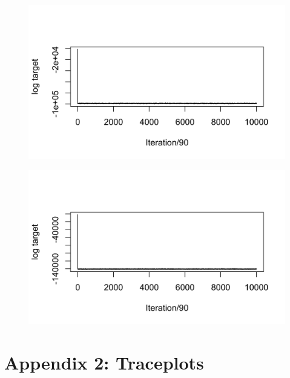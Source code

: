     \begin{figure}[H]
        \begin{center}
            \includegraphics{Log Target Plot - ST - Major 2.png}
        \end{center}
    \end{figure}

\restoregeometry

    \begin{figure}[H]
        \begin{center}
            \includegraphics{Log Target Plot - ST - Major 13456.png}
        \end{center}
    \end{figure}

    \newpage

\section*{Appendix 2: Traceplots} \label{app:trace-plots}


